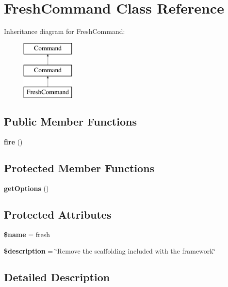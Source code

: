 \section{Fresh\+Command Class Reference}
\label{class_illuminate_1_1_foundation_1_1_console_1_1_fresh_command}
Inheritance diagram for Fresh\+Command\+:\begin{figure}[H]
\begin{center}
\leavevmode
\includegraphics[height=3.000000cm]{class_illuminate_1_1_foundation_1_1_console_1_1_fresh_command}
\end{center}
\end{figure}
\subsection*{Public Member Functions}
\begin{DoxyCompactItemize}
\item 
{\bf fire} ()
\end{DoxyCompactItemize}
\subsection*{Protected Member Functions}
\begin{DoxyCompactItemize}
\item 
{\bf get\+Options} ()
\end{DoxyCompactItemize}
\subsection*{Protected Attributes}
\begin{DoxyCompactItemize}
\item 
{\bf \$name} = \textquotesingle{}fresh\textquotesingle{}
\item 
{\bf \$description} = \char`\"{}Remove the scaffolding included with the framework\char`\"{}
\end{DoxyCompactItemize}


\subsection{Detailed Description}


